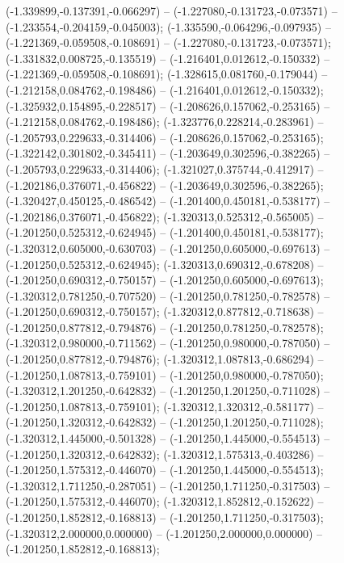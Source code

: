  (-1.339899,-0.137391,-0.066297) -- (-1.227080,-0.131723,-0.073571) -- (-1.233554,-0.204159,-0.045003);
 (-1.335590,-0.064296,-0.097935) -- (-1.221369,-0.059508,-0.108691) -- (-1.227080,-0.131723,-0.073571);
 (-1.331832,0.008725,-0.135519) -- (-1.216401,0.012612,-0.150332) -- (-1.221369,-0.059508,-0.108691);
 (-1.328615,0.081760,-0.179044) -- (-1.212158,0.084762,-0.198486) -- (-1.216401,0.012612,-0.150332);
 (-1.325932,0.154895,-0.228517) -- (-1.208626,0.157062,-0.253165) -- (-1.212158,0.084762,-0.198486);
 (-1.323776,0.228214,-0.283961) -- (-1.205793,0.229633,-0.314406) -- (-1.208626,0.157062,-0.253165);
 (-1.322142,0.301802,-0.345411) -- (-1.203649,0.302596,-0.382265) -- (-1.205793,0.229633,-0.314406);
 (-1.321027,0.375744,-0.412917) -- (-1.202186,0.376071,-0.456822) -- (-1.203649,0.302596,-0.382265);
 (-1.320427,0.450125,-0.486542) -- (-1.201400,0.450181,-0.538177) -- (-1.202186,0.376071,-0.456822);
 (-1.320313,0.525312,-0.565005) -- (-1.201250,0.525312,-0.624945) -- (-1.201400,0.450181,-0.538177);
 (-1.320312,0.605000,-0.630703) -- (-1.201250,0.605000,-0.697613) -- (-1.201250,0.525312,-0.624945);
 (-1.320313,0.690312,-0.678208) -- (-1.201250,0.690312,-0.750157) -- (-1.201250,0.605000,-0.697613);
 (-1.320312,0.781250,-0.707520) -- (-1.201250,0.781250,-0.782578) -- (-1.201250,0.690312,-0.750157);
 (-1.320312,0.877812,-0.718638) -- (-1.201250,0.877812,-0.794876) -- (-1.201250,0.781250,-0.782578);
 (-1.320312,0.980000,-0.711562) -- (-1.201250,0.980000,-0.787050) -- (-1.201250,0.877812,-0.794876);
 (-1.320312,1.087813,-0.686294) -- (-1.201250,1.087813,-0.759101) -- (-1.201250,0.980000,-0.787050);
 (-1.320312,1.201250,-0.642832) -- (-1.201250,1.201250,-0.711028) -- (-1.201250,1.087813,-0.759101);
 (-1.320312,1.320312,-0.581177) -- (-1.201250,1.320312,-0.642832) -- (-1.201250,1.201250,-0.711028);
 (-1.320312,1.445000,-0.501328) -- (-1.201250,1.445000,-0.554513) -- (-1.201250,1.320312,-0.642832);
 (-1.320312,1.575313,-0.403286) -- (-1.201250,1.575312,-0.446070) -- (-1.201250,1.445000,-0.554513);
 (-1.320312,1.711250,-0.287051) -- (-1.201250,1.711250,-0.317503) -- (-1.201250,1.575312,-0.446070);
 (-1.320312,1.852812,-0.152622) -- (-1.201250,1.852812,-0.168813) -- (-1.201250,1.711250,-0.317503);
 (-1.320312,2.000000,0.000000) -- (-1.201250,2.000000,0.000000) -- (-1.201250,1.852812,-0.168813);
